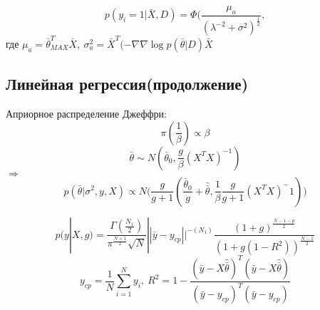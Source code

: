 $$ p(y_i=1|\bar{X}, D) =   \Phi(\frac{\mu_a}{(\lambda^{-2} + \sigma^2)^{\frac{1}{2}}},$$
где $\mu_a = \bar{\theta}_{MAX}^T \bar{X}, \ \sigma_a^2 = \bar{X}^T(-\nabla \nabla \log p(\bar{\theta}|D) \bar{X}$

\subsection*{Линейная регрессия(продолжение)}
Априорное распределение Джеффри:
$$ \pi(\frac{1}{\beta}) \propto \beta $$
$$ \bar{\theta} \sim N(\bar{\theta}_0, \frac{g}{\beta}(X^TX)^{-1}) $$
$\Rightarrow$
$$ p(\bar{\theta}|\sigma^2, y, X) \propto N\Big( \frac{g}{g+1}(\frac{\bar{\theta}_0}{g} + \hat{\bar{\theta}}, \frac{1}{\beta} \frac{g}{g+1}(X^TX)^-1)\Big)$$

$$ p(y|X,g) = \frac{\Gamma (\frac{N_1}{2})}{\pi^{\frac{N+1}{2}}\sqrt{N}} || \bar{y} - y_{cp} ||^{-(N_1)} \frac{(1+g)^{\frac{N-1-p}{2}}}{(1+g(1-R^2))^{\frac{N-1}{2}}} $$
$$ y_{cp} = \frac{1}{N} \sum_{i=1}^N y_i, \ R^2 = 1 - \frac{(\bar{y} - X\hat{\bar{\theta}})^T(\bar{y} - X\hat{\bar{\theta}})}{(\bar{y} - y_{cp})^T(\bar{y} - y_{cp})} $$
